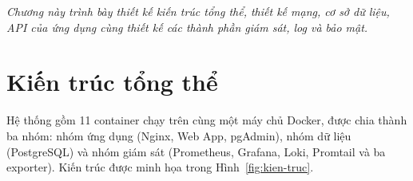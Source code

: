 \documentclass[../main.tex]{subfiles}
\begin{document}
\textit{Chương này trình bày thiết kế kiến trúc tổng thể, thiết kế mạng, cơ sở dữ liệu, API của ứng dụng cùng thiết kế các thành phần giám sát, log và bảo mật.}

\section{Kiến trúc tổng thể}
Hệ thống gồm 11 container chạy trên cùng một máy chủ Docker, được chia thành ba nhóm: nhóm ứng dụng (Nginx, Web App, pgAdmin), nhóm dữ liệu (PostgreSQL) và nhóm giám sát (Prometheus, Grafana, Loki, Promtail và ba exporter). Kiến trúc được minh họa trong Hình~\ref{fig:kien-truc}.

\end{document}
